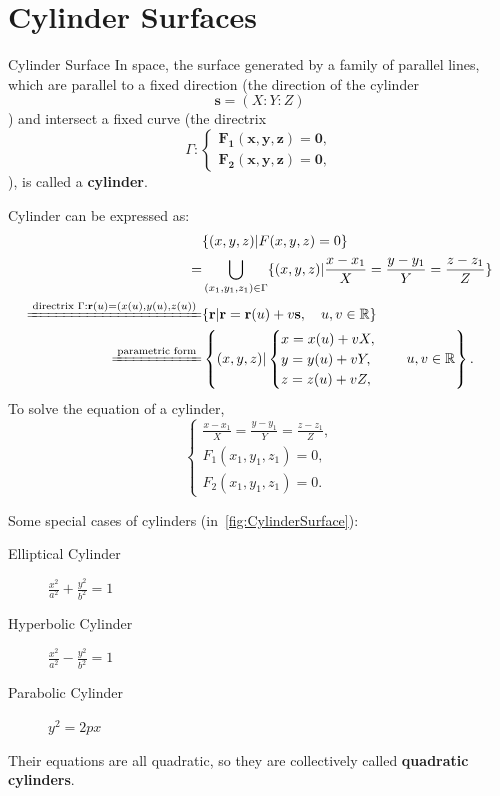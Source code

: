 \documentclass[11pt]{../../TexTemplate/elegantbook} %
\begin{document}
\section{Cylinder Surfaces}
\begin{definition}{Cylinder Surface}
    In space, the surface generated by a family of parallel lines, 
    which are parallel to a fixed direction (the direction of the cylinder \[\mathbf{s} = (X : Y : Z)\]) 
    and intersect a fixed curve (the directrix \[\Gamma : \mathbf{\begin{cases} F_{1}(x,y,z) = 0,\\ F_{2}(x,y,z) = 0,\end{cases}}\]), 
    is called a \textbf{cylinder}.
\end{definition}
Cylinder can be expressed as:
\begin{align*}
    &\{ (x,y,z) | F(x,y,z) = 0 \} \\
    =&\bigcup_{(x_{1},y_{1},z_{1}) \in \Gamma} \{ (x,y,z) | \frac{x - x_{1}}{X} = \frac{y - y_{1}}{Y} = \frac{z - z_{1}}{Z} \}\\
    \xlongequal{\text{directrix } \Gamma:\mathbf{r}(u)=(x(u),y(u),z(u))}
    &\{ \mathbf{r} | \mathbf{r} = \mathbf{r}(u)+v \mathbf{s},\quad u,v \in \mathbb{R} \} \\
    \xlongequal{\text{parametric form}}
    &  \left\{ (x,y,z) | \begin{cases} x = x(u) + vX, \\ y = y(u) + vY, \\ z = z(u) + vZ, \end{cases}\quad u,v \in \mathbb{R} \right\}.
\end{align*}
To solve the equation of a cylinder,
\[
\begin{cases}
    \frac{x - x_{1}}{X} = \frac{y - y_{1}}{Y} = \frac{z - z_{1}}{Z}, \\
    F_{1}(x_{1},y_{1},z_{1}) = 0, \\
    F_{2}(x_{1},y_{1},z_{1}) = 0.
\end{cases}
\]

\vspace{0.7cm}
Some special cases of cylinders (in~\ref{fig:CylinderSurface}):
\begin{description}
    \item[Elliptical Cylinder] \(\frac{x^2}{a^2} + \frac{y^2}{b^2} = 1\)
    \item[Hyperbolic Cylinder] \(\frac{x^2}{a^2} - \frac{y^2}{b^2} = 1\)
    \item[Parabolic Cylinder] \(y^{2} = 2px\)
\end{description}
Their equations are all quadratic, so they are collectively called \textbf{quadratic cylinders}.
\end{document}
